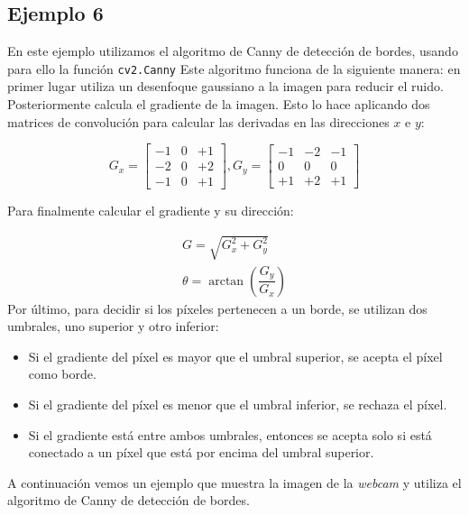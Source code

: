 \documentclass[a4paper,openright, 12pt]{book}
\begin{document}
\subsection*{Ejemplo 6}
En este ejemplo utilizamos el algoritmo de Canny \cite{canny86} de detección de bordes, usando para ello la función \lstinline|cv2.Canny|
 Este algoritmo funciona de la siguiente manera: en primer lugar utiliza un desenfoque gaussiano a la imagen para reducir el ruido. Posteriormente calcula el gradiente de la imagen. Esto lo hace aplicando dos matrices de convolución para calcular las derivadas en las direcciones $x$ e $y$:

\begin{equation*}
G_{x} = \begin{bmatrix} -1 & 0 & +1 \\ -2 & 0 & +2 \\ -1 & 0 & +1 \end{bmatrix},  G_{y} = \begin{bmatrix} -1 & -2 & -1 \\ 0 & 0 & 0 \\ +1 & +2 & +1 \end{bmatrix}
\end{equation*}

Para finalmente calcular el gradiente y su dirección:

\begin{equation*}
\begin{array}{l} G = \sqrt{ G_{x}^{2} + G_{y}^{2} } \\ \theta = \arctan(\dfrac{ G_{y} }{ G_{x} }) \end{array}
\end{equation*}
Por último, para decidir si los píxeles pertenecen a un borde, se utilizan dos umbrales, uno superior y otro inferior:
\begin{itemize}
\item Si el gradiente del píxel es mayor que el umbral superior, se acepta el píxel como borde.
\item Si el gradiente del píxel es menor que el umbral inferior, se rechaza el píxel.
\item Si el gradiente está entre ambos umbrales, entonces se acepta solo si está conectado a un píxel que está por encima del umbral superior.
\end{itemize}

A continuación vemos un ejemplo que muestra la imagen de la \textit{webcam} y utiliza el algoritmo de Canny de detección de bordes.
\end{document}
